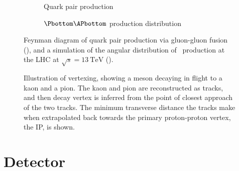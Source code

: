 \begin{figure}
  \begin{subfigure}[b]{0.4\textwidth}
    \centering
    
    \caption{Quark pair production}
    \label{fig:intro:lhcb:hf_production:gg_fusion}
  \end{subfigure}
  \begin{subfigure}[b]{0.6\textwidth}
    
    \caption{$\Pbottom\APbottom$ production distribution}
    \label{fig:intro:lhcb:hf_production:bbbar_angles}
  \end{subfigure}
  \caption{%
    Feynman diagram of quark pair production via gluon-gluon fusion 
    (), and a simulation of the 
    angular distribution of \bbbar\ production at the \ac{LHC} at $\sqrt{s} = 
    \SI{13}{\TeV}$ ().
  }
  \label{fig:intro:lhcb:hf_production}
\end{figure}

\begin{figure}
  \centering
  
  \caption{%
    Illustration of vertexing, showing a \PDz meson decaying in flight to a 
    kaon and a pion.
    The kaon and pion are reconstructed as tracks, and then \PDz decay vertex 
    is inferred from the point of closest approach of the two tracks.
    The minimum transverse distance the tracks make when extrapolated back 
    towards the primary proton-proton vertex, the \acf{IP}, is shown.
  }
  \label{fig:intro:lhcb:vertexing}
\end{figure}



\section{Detector}
\label{chap:intro:lhcb:detector}

